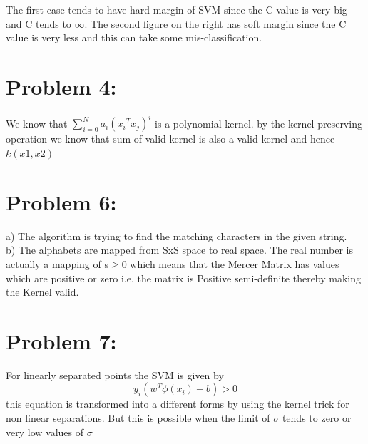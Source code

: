 \documentclass[5pt,a4paper]{article}
\begin{document}
The first case tends to have hard margin of SVM since the C value is very big and C tends to $\infty$. The second figure on the right has soft margin since the C value is very less and this can take some mis-classification.\\ 
	
	\section*{Problem 4:}
	We know that $ \sum_{i=0}^{N} a_i({x_i}^T {x_j})^i $ is a polynomial kernel. by the kernel preserving operation we know that sum of valid kernel is also a valid kernel and hence $k(x1,x2)$
	
	
	\section*{Problem 6:}
	a) The algorithm is trying to find the matching characters in the given string.\\
	b) The alphabets are mapped from SxS space to real space. The real number is actually a mapping of s$ \ge$0 which means that the Mercer Matrix has values which are positive or zero i.e. the matrix is Positive semi-definite thereby making the Kernel valid. 
	\section*{Problem 7:}
	For linearly separated points the SVM is given by 
	\begin{equation}
	y_i(w^T \phi(x_i)+b) > 0 
	\end{equation} this equation is transformed into a different forms by using the kernel trick for non linear separations. But this is possible when the limit of $\sigma$ tends to zero or very low values of $\sigma$
	
	
\end{document}
